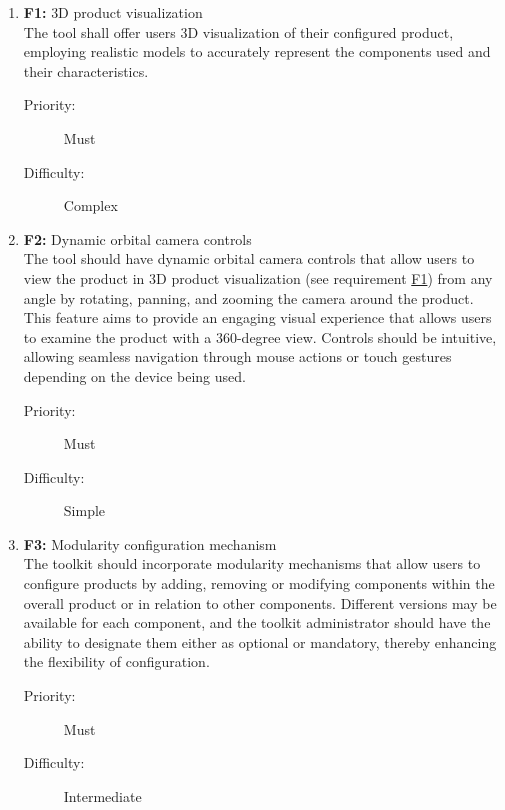 \begin{enumerate}
\item \textbf{F1:} \label{itm:F1} 3D product visualization
\vspace{2pt}
\\The tool shall offer users 3D visualization of their configured product, employing realistic models to accurately represent the components used and their characteristics.
\begin{description}
    \item[Priority:] Must
    \item[Difficulty:] Complex
\end{description}
\vspace{4pt}

\item \textbf{F2:} Dynamic orbital camera controls
\vspace{2pt}
\\The tool should have dynamic orbital camera controls that allow users to view the product in 3D product visualization (see requirement \hyperref[itm:F1]{F1}) from any angle by rotating, panning, and zooming the camera around the product. This feature aims to provide an engaging visual experience that allows users to examine the product with a 360-degree view. Controls should be intuitive, allowing seamless navigation through mouse actions or touch gestures depending on the device being used.
\begin{description}
    \item[Priority:] Must
    \item[Difficulty:] Simple
\end{description}
\vspace{4pt}

\item \textbf{F3:} \label{itm:F3} Modularity configuration mechanism
\vspace{2pt}
\\The toolkit should incorporate modularity mechanisms that allow users to configure products by adding, removing or modifying components within the overall product or in relation to other components. Different versions may be available for each component, and the toolkit administrator should have the ability to designate them either as optional or mandatory, thereby enhancing the flexibility of configuration.
\begin{description}
    \item[Priority:] Must
    \item[Difficulty:] Intermediate
\end{description}
\vspace{4pt}


\end{enumerate}
